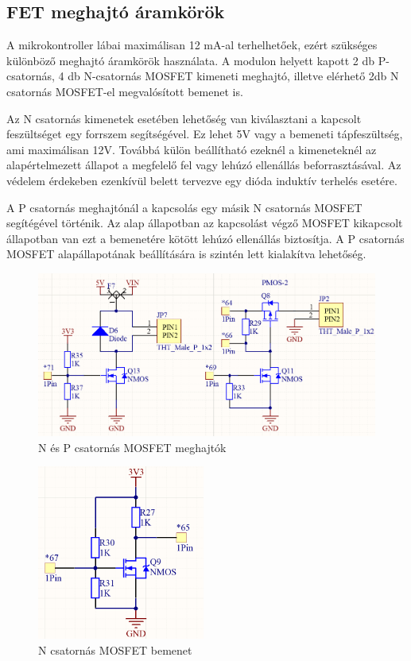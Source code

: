 \subsection{FET meghajtó áramkörök}
A mikrokontroller lábai maximálisan 12 mA-al terhelhetőek, ezért szükséges különböző meghajtó áramkörök használata. A modulon helyett kapott 2 db P-csatornás, 4 db N-csatornás MOSFET kimeneti meghajtó, illetve elérhető 2db N csatornás MOSFET-el megvalósított bemenet is.

Az N csatornás kimenetek esetében lehetőség van kiválasztani a kapcsolt feszültséget egy forrszem segítségével. Ez lehet 5V vagy a bemeneti tápfeszültség, ami maximálisan 12V. Továbbá külön beállítható ezeknél a kimeneteknél az alapértelmezett állapot a megfelelő fel vagy lehúzó ellenállás beforrasztásával. Az védelem érdekeben ezenkívül belett tervezve egy dióda induktív terhelés esetére.

A P csatornás meghajtónál a kapcsolás egy másik N csatornás MOSFET segítégével történik. Az alap állapotban az kapcsolást végző MOSFET kikapcsolt állapotban van ezt a bemenetére kötött lehúzó ellenállás biztosítja. A P csatornás MOSFET alapállapotának beállítására is szintén lett kialakítva lehetőség.

\begin{figure}[!ht]
    \centering
    \includegraphics[width=140mm, keepaspectratio]{figures/n_p_driver.png}
    \caption{N és P csatornás MOSFET meghajtók}
    \label{fig:p_channel_mosfet}
\end{figure}

\begin{figure}[!ht]
    \centering
    \includegraphics[width=55mm, keepaspectratio]{figures/n_input.png}
    \caption{N csatornás MOSFET bemenet}
    \label{fig:n_channel_mosfet}
\end{figure}

